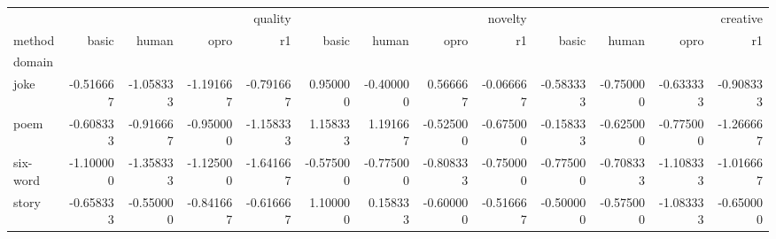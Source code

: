 \begin{tabular}{lrrrrrrrrrrrr}
\toprule
 & \multicolumn{4}{r}{quality} & \multicolumn{4}{r}{novelty} & \multicolumn{4}{r}{creative} \\
method & basic & human & opro & r1 & basic & human & opro & r1 & basic & human & opro & r1 \\
domain &  &  &  &  &  &  &  &  &  &  &  &  \\
\midrule
joke & -0.516667 & -1.058333 & -1.191667 & -0.791667 & 0.950000 & -0.400000 & 0.566667 & -0.066667 & -0.583333 & -0.750000 & -0.633333 & -0.908333 \\
poem & -0.608333 & -0.916667 & -0.950000 & -1.158333 & 1.158333 & 1.191667 & -0.525000 & -0.675000 & -0.158333 & -0.625000 & -0.775000 & -1.266667 \\
six-word & -1.100000 & -1.358333 & -1.125000 & -1.641667 & -0.575000 & -0.775000 & -0.808333 & -0.750000 & -0.775000 & -0.708333 & -1.108333 & -1.016667 \\
story & -0.658333 & -0.550000 & -0.841667 & -0.616667 & 1.100000 & 0.158333 & -0.600000 & -0.516667 & -0.500000 & -0.575000 & -1.083333 & -0.650000 \\
\bottomrule
\end{tabular}
